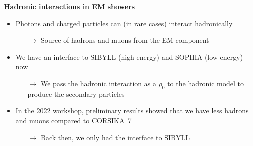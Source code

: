 \documentclass[aspectratio=1610, 9pt]{beamer}
\begin{document}
\begin{frame}
\textbf{Hadronic interactions in EM showers}

    \begin{itemize}
      \item Photons and charged particles can (in rare cases) interact hadronically
      \begin{itemize}
        \item[$\rightarrow$] Source of hadrons and muons from the EM component
      \end{itemize}
      \item We have an interface to SIBYLL (high-energy) and SOPHIA (low-energy) now
      \begin{itemize}
        \item[$\rightarrow$] We pass the hadronic interaction as a $\rho_0$ to the hadronic model to produce the secondary particles
      \end{itemize}
      \item In the 2022 workshop, preliminary results showed that we have less hadrons and muons compared to CORSIKA~7
      \begin{itemize}
        \item[$\rightarrow$] Back then, we only had the interface to SIBYLL
      \end{itemize}
    \end{itemize}

\end{frame}
\end{document}
